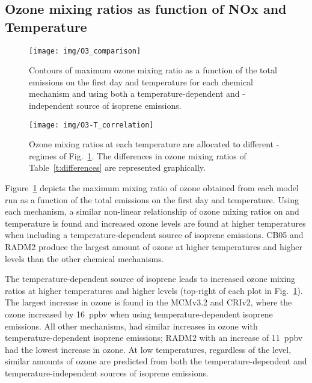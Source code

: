 \subsection{Ozone mixing ratios as function of NOx and Temperature} \label{ss:r_contours}

\begin{figure}%
    \centering%
    \caption{Contours of maximum ozone mixing ratio as a function of the total  emissions on the first day and temperature for each chemical mechanism and using both a temperature-dependent and -independent source of isoprene emissions.}
    \label{f:ozone_contours}%
    \texttt{[image: img/O3\_comparison]}
\end{figure}

\begin{figure}%
    \centering%
    \caption{Ozone mixing ratios at each temperature are allocated to different -regimes of Fig.~\ref{f:ozone_contours}. The differences in ozone mixing ratios of Table~\ref{t:differences} are represented graphically.}%
    \label{f:O3-T}%
    \texttt{[image: img/O3-T\_correlation]}%
\end{figure}

\begin{table}%
    \centering%
    \caption{Increase in ozone mixing ratio (ppbv) due to chemistry and emissions at $40$~$^{\circ}$C from reference temperature ($20$~$^{\circ}$C) in the -regimes of Fig.~\ref{f:ozone_contours}.}%
    \label{t:differences}%
    
\end{table}

Figure~\ref{f:ozone_contours} depicts the maximum mixing ratio of ozone obtained from each model run as a function of the total  emissions on the first day and temperature.
Using each mechanism, a similar non-linear relationship of ozone mixing ratios on  and temperature is found and increased ozone levels are found at higher temperatures when including a temperature-dependent source of isoprene emissions.
CB05 and RADM2 produce the largest amount of ozone at higher temperatures and higher  levels than the other chemical mechanisms.

The temperature-dependent source of isoprene leads to increased ozone mixing ratios at higher temperatures and higher  levels (top-right of each plot in Fig.~\ref{f:ozone_contours}).
The largest increase in ozone is found in the MCMv3.2 and CRIv2, where the ozone increased by 16~ppbv when using temperature-dependent isoprene emissions.
All other mechanisms, had similar increases in ozone with temperature-dependent isoprene emissions; RADM2 with an increase of 11~ppbv had the lowest increase in ozone.
At low temperatures, regardless of the  level, similar amounts of ozone are predicted from both the temperature-dependent and temperature-independent sources of isoprene emissions.

